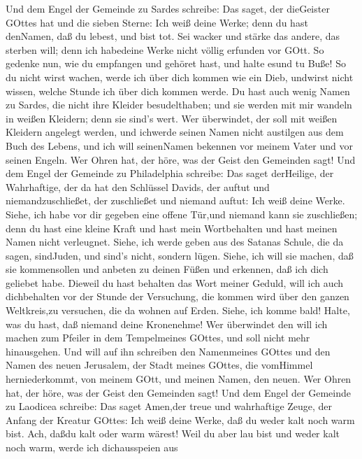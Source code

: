  Und dem Engel der Gemeinde zu Sardes schreibe: Das saget,
der dieGeister GOttes hat und die sieben Sterne: Ich weiß deine Werke;
denn du hast denNamen, daß du lebest, und bist tot.  Sei
wacker und stärke das andere, das sterben will; denn ich habedeine Werke
nicht völlig erfunden vor GOtt.  So gedenke nun, wie du
empfangen und gehöret hast, und halte esund tu Buße! So du nicht wirst
wachen, werde ich über dich kommen wie ein Dieb, undwirst nicht wissen,
welche Stunde ich über dich kommen werde.  Du hast auch
wenig Namen zu Sardes, die nicht ihre Kleider besudelthaben; und sie
werden mit mir wandeln in weißen Kleidern; denn sie sind's wert.
 Wer überwindet, der soll mit weißen Kleidern angelegt
werden, und ichwerde seinen Namen nicht austilgen aus dem Buch des
Lebens, und ich will seinenNamen bekennen vor meinem Vater und vor
seinen Engeln.  Wer Ohren hat, der höre, was der Geist den
Gemeinden sagt!  Und dem Engel der Gemeinde zu Philadelphia
schreibe: Das saget derHeilige, der Wahrhaftige, der da hat den
Schlüssel Davids, der auftut und niemandzuschließet, der zuschließet und
niemand auftut:  Ich weiß deine Werke. Siehe, ich habe vor
dir gegeben eine offene Tür,und niemand kann sie zuschließen; denn du
hast eine kleine Kraft und hast mein Wortbehalten und hast meinen Namen
nicht verleugnet.  Siehe, ich werde geben aus des Satanas
Schule, die da sagen, sindJuden, und sind's nicht, sondern lügen. Siehe,
ich will sie machen, daß sie kommensollen und anbeten zu deinen Füßen
und erkennen, daß ich dich geliebet habe.  Dieweil du hast
behalten das Wort meiner Geduld, will ich auch dichbehalten vor der
Stunde der Versuchung, die kommen wird über den ganzen Weltkreis,zu
versuchen, die da wohnen auf Erden.  Siehe, ich komme bald!
Halte, was du hast, daß niemand deine Kronenehme!  Wer
überwindet den will ich machen zum Pfeiler in dem Tempelmeines GOttes,
und soll nicht mehr hinausgehen. Und will auf ihn schreiben den
Namenmeines GOttes und den Namen des neuen Jerusalem, der Stadt meines
GOttes, die vomHimmel herniederkommt, von meinem GOtt, und meinen Namen,
den neuen.  Wer Ohren hat, der höre, was der Geist den
Gemeinden sagt!  Und dem Engel der Gemeinde zu Laodicea
schreibe: Das saget Amen,der treue und wahrhaftige Zeuge, der Anfang der
Kreatur GOttes:  Ich weiß deine Werke, daß du weder kalt
noch warm bist. Ach, daßdu kalt oder warm wärest!  Weil du
aber lau bist und weder kalt noch warm, werde ich dichausspeien aus
